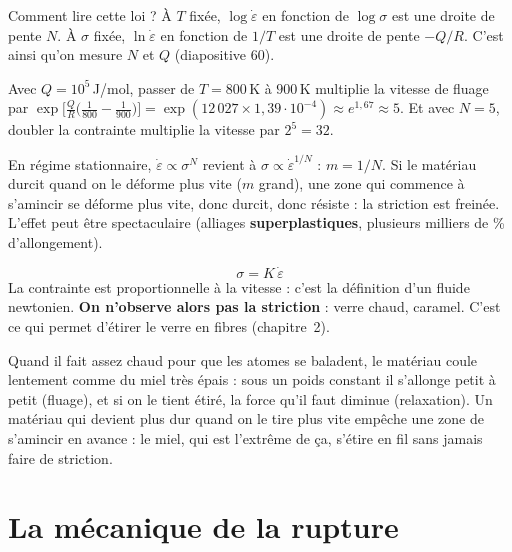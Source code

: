 Comment lire cette loi ? À $T$ fixée, $\log\dot\varepsilon$ en fonction de $\log\sigma$ est une
droite de pente $N$. À $\sigma$ fixée, $\ln\dot\varepsilon$ en fonction de $1/T$ est une droite
de pente $-Q/R$. C'est ainsi qu'on mesure $N$ et $Q$ (diapositive 60).

\begin{exbox}[title={Ordre de grandeur (pas dans les diapositives)}]
Avec $Q = 10^5$\,J/mol, passer de $T = 800$\,K à $900$\,K multiplie la vitesse de fluage par
$\exp\!\big[\frac{Q}{R}\big(\frac{1}{800} - \frac{1}{900}\big)\big]
= \exp(12\,027 \times 1{,}39\cdot10^{-4}) \approx e^{1{,}67} \approx 5$.
Et avec $N = 5$, doubler la contrainte multiplie la vitesse par $2^5 = 32$.
\end{exbox}

\begin{propbox}[title={Lien entre $m$ et $N$ ; pourquoi $m$ empêche la striction}]
En régime stationnaire, $\dot\varepsilon \propto \sigma^N$ revient à
$\sigma \propto \dot\varepsilon^{1/N}$ : \textbf{$m = 1/N$}.
Si le matériau durcit quand on le déforme plus vite ($m$ grand), une zone qui commence à
s'amincir se déforme plus vite, donc durcit, donc résiste : la striction est freinée. L'effet
peut être spectaculaire (alliages \textbf{superplastiques}, plusieurs milliers de \% d'allongement).
\end{propbox}

\begin{thmbox}[title={Cas extrême : le fluide visqueux newtonien ($m = 1$)}]
\[ \sigma = K\,\dot\varepsilon \]
La contrainte est proportionnelle à la vitesse : c'est la définition d'un fluide newtonien.
\textbf{On n'observe alors pas la striction} : verre chaud, caramel. C'est ce qui permet
d'étirer le verre en fibres (chapitre~2).
\end{thmbox}

\begin{goatbox}
Quand il fait assez chaud pour que les atomes se baladent, le matériau coule lentement comme
du miel très épais : sous un poids constant il s'allonge petit à petit (fluage), et si on le
tient étiré, la force qu'il faut diminue (relaxation). Un matériau qui devient plus dur quand
on le tire plus vite empêche une zone de s'amincir en avance : le miel, qui est l'extrême de
ça, s'étire en fil sans jamais faire de striction.
\end{goatbox}

\section{La mécanique de la rupture}

